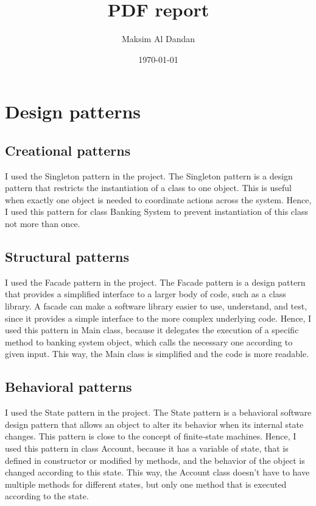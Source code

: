 \documentclass{report}
\title{PDF report}
\author{Maksim Al Dandan}
\date{\today}
\begin{document}
\maketitle
\newpage

\section*{Design patterns}
\subsection*{Creational patterns}

I used the Singleton pattern in the project. The Singleton pattern is a design pattern that restricts the instantiation of a class to one object. This is useful when exactly one object is needed to coordinate actions across the system. Hence, I used this pattern for class Banking System to prevent instantiation of this class not more than once.

\subsection*{Structural patterns}

I used the Facade pattern in the project. The Facade pattern is a design pattern that provides a simplified interface to a larger body of code, such as a class library. A facade can make a software library easier to use, understand, and test, since it provides a simple interface to the more complex underlying code. Hence, I used this pattern in Main class, because it delegates the execution of a specific method to banking system object, which calls the necessary one according to given input. This way, the Main class is simplified and the code is more readable.

\subsection*{Behavioral patterns}

I used the State pattern in the project. The State pattern is a behavioral software design pattern that allows an object to alter its behavior when its internal state changes. This pattern is close to the concept of finite-state machines. Hence, I used this pattern in class Account, because it has a variable of state, that is defined in constructor or modified by methods, and the behavior of the object is changed according to this state. This way, the Account class doesn't have to have multiple methods for different states, but only one method that is executed according to the state.
\end{document}

